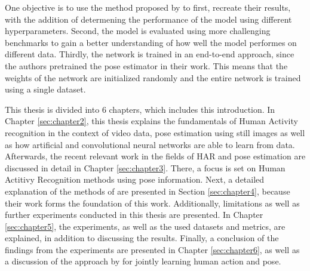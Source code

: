 
One objective is to use the method proposed by \cite{luvizon_2d/3d_2018} to first, recreate their results, with the addition of determening the performance of the model using different hyperparameters.
Second, the model is evaluated using more challenging benchmarks to gain a better understanding of how well the model performes on different data.
Thirdly, the network is trained in an end-to-end approach, since the authors pretrained the pose estimator in their work.
This means that the weights of the network are initialized randomly and the entire network is trained using a single dataset.

This thesis is divided into $6$ chapters, which includes this introduction.
In Chapter \ref{sec:chapter2}, this thesis explains the fundamentals of Human Activity recognition in the context of video data, pose estimation using still images as well as how artificial and convolutional neural networks are able to learn from data.
Afterwards, the recent relevant work in the fields of HAR and pose estimation are discussed in detail in Chapter \ref{sec:chapter3}.
There, a focus is set on Human Actitivy Recognition methods using pose information.
Next, a detailed explanation of the methods of \cite{luvizon_2d/3d_2018} are presented in Section \ref{sec:chapter4}, because their work forms the foundation of this work.
Additionally, limitations as well as further experiments conducted in this thesis are presented.
In Chapter \ref{sec:chapter5}, the experiments, as well as the used datasets and metrics, are explained, in addition to discussing the results.
Finally, a conclusion of the findings from the experiments are presented in Chapter \ref{sec:chapter6}, as well as a discussion of the approach by \cite{luvizon_2d/3d_2018} for jointly learning human action and pose.

